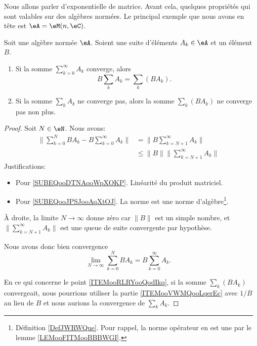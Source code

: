 Nous allons parler d'exponentielle de matrice. Avant cela, quelques propriétés qui sont valables sur des algèbres normées. Le principal exemple que nous avons en tête est \( \eA=\eM(n,\eC)\).

\begin{proposition}      \label{PROPooMZZQooEhQsgQ}
	Soit une algèbre normée \( \eA\). Soient une suite d'éléments \( A_k\in \eA\) et un élément \( B\).
	\begin{enumerate}
		\item		\label{ITEMooVWMQooLqerEc}
		      Si la somme \( \sum_{k=0}^{\infty}A_k\) converge, alors
		      \begin{equation}		\label{EQooPOFWooGNWIUF}
			      B\sum_kA_k=\sum_k(BA_k).
		      \end{equation}
		\item		\label{ITEMooRLRYooQodIkq}
		      Si la somme \( \sum_kA_k\) ne converge pas, alors la somme \( \sum_k(BA_k)\) ne converge pas non plus.
	\end{enumerate}
\end{proposition}

\begin{proof}
	Soit \( N\in \eN\). Nous avons:
	\begin{subequations}
		\begin{align}
			\| \sum_{k=0}^NBA_k-B\sum_{k=0}^{\infty}A_k \| & =\| B\sum_{k=N+1}^{\infty}A_k \|            \label{SUBEQooDTNAooWpXOKP} \\
			                                               & \leq \| B \|\| \sum_{k=N+1}^{\infty}A_k \|  \label{SUBEQooJPSJooAqXtOJ}
		\end{align}
	\end{subequations}
	Justifications:
	\begin{itemize}
		\item Pour \eqref{SUBEQooDTNAooWpXOKP}. Linéarité du produit matriciel.
		\item Pour \eqref{SUBEQooJPSJooAqXtOJ}. La norme est une norme d'algèbre\footnote{Définition \ref{DefJWRWQue}. Pour rappel, la norme opérateur en est une par le lemme \ref{LEMooFITMooBBBWGI}.}.
	\end{itemize}
	À droite, la limite \( N\to \infty\) donne zéro car \( \| B \|\) est un simple nombre, et \( \| \sum_{k=N+1}^{\infty}A_k \|\) est une queue de suite convergente par hypothèse.

	Nous avons donc bien convergence
	\begin{equation}
		\lim_{N\to \infty}\sum_{k=0}^{N}BA_k=B\sum_{k=0}^{\infty}A_k.
	\end{equation}

	En ce qui concerne le point \ref{ITEMooRLRYooQodIkq}, si la somme \( \sum_k(BA_k)\) convergeait, nous pourrions utiliser la partie \ref{ITEMooVWMQooLqerEc} avec \( 1/B\) au lieu de \( B\) et nous aurions la convergence de \( \sum_kA_k\).
\end{proof}


